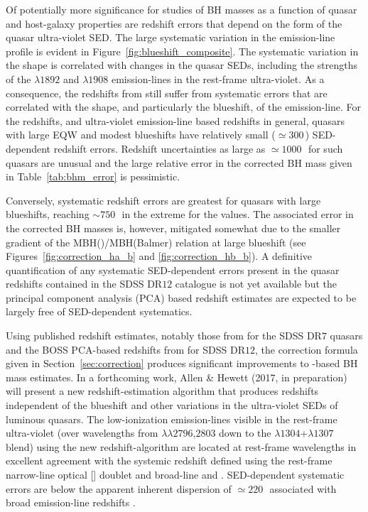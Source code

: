 Of potentially more significance for studies of BH masses as a function of quasar and host-galaxy properties are redshift errors that depend on the form of the quasar ultra-violet SED.
The large systematic variation in the  emission-line profile is evident in Figure~\ref{fig:blueshift_composite}.
The systematic variation in the  shape is correlated with changes in the quasar SEDs, including the strengths of the $\lambda$$1892$ and $\lambda$$1908$ emission-lines in the rest-frame ultra-violet. 
As a consequence, the redshifts from \citet{hewett10} still suffer from systematic errors that are correlated with the shape, and particularly the blueshift, of the  emission-line.
For the \citet{hewett10} redshifts, and ultra-violet emission-line based redshifts in general, quasars with large  EQW and modest blueshifts have relatively small ($\simeq300$\,\kms) SED-dependent redshift errors.
Redshift uncertainties as large as $\simeq1000$\,\kms\, for such quasars are unusual and the large relative error in the corrected  BH mass given in Table~\ref{tab:bhm_error} is pessimistic. 

Conversely, systematic redshift errors are greatest for quasars with large blueshifts, reaching $\sim750$\,\kms\, in the extreme for the \citet{hewett10} values. 
The associated error in the corrected  BH masses is, however, mitigated somewhat due to the smaller gradient of the MBH()/MBH(Balmer) relation at large  blueshift (see Figures~\ref{fig:correction_ha_b} and \ref{fig:correction_hb_b}). 
A definitive quantification of any systematic SED-dependent errors present in the quasar redshifts contained in the SDSS DR$12$ catalogue is not yet available but the principal component analysis (PCA) based redshift estimates are expected to be largely free of SED-dependent systematics. 

Using published redshift estimates, notably those from \citet{hewett10} for the SDSS DR$7$ quasars and the BOSS PCA-based redshifts from \citet{paris17} for SDSS DR$12$, the correction formula given in Section~\ref{sec:correction} produces significant improvements to -based BH mass estimates.
In a forthcoming work, Allen \& Hewett (2017, in preparation) will present a new redshift-estimation algorithm that produces redshifts independent of the  blueshift and other variations in the ultra-violet SEDs of luminous quasars.
The low-ionization emission-lines visible in the rest-frame ultra-violet (over wavelengths from $\lambda\lambda$$2796$,$2803$ down to the $\lambda$$1304$+$\lambda$$1307$ blend) using the new redshift-algorithm are located at rest-frame wavelengths in excellent agreement with the systemic redshift defined using the rest-frame narrow-line optical [] doublet and broad-line \hb and \hans.
SED-dependent systematic errors are below the apparent inherent dispersion of $\simeq220$\,\kms\, associated with broad emission-line redshifts \citep{shen16b}.

